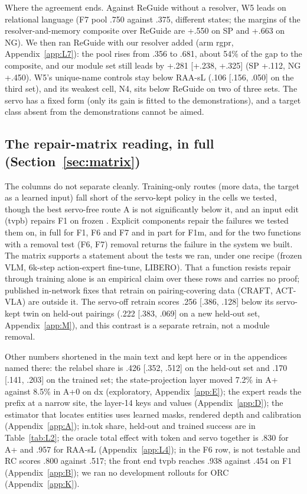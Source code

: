 Where the agreement ends. Against ReGuide without a resolver, W5 leads on relational language (F7 pool .750 against .375, different states; the margins of the resolver-and-memory composite over ReGuide are +.550 on SP and +.663 on NG). We then ran ReGuide with our resolver added (arm rgpr, Appendix~\ref{app:L7}): the pool rises from .356 to .681, about 54\% of the gap to the composite, and our module set still leads by +.281 [+.238, +.325] (SP +.112, NG +.450). W5's unique-name controls stay below RAA-sL (\mi.106 [\mi.156, \mi.050] on the third set), and its weakest cell, N4, sits below ReGuide on two of three sets. The servo has a fixed form (only its gain is fitted to the demonstrations), and a target class absent from the demonstrations cannot be aimed.

\subsection{The repair-matrix reading, in full (Section~\ref{sec:matrix})}
\label{app:L6}

The columns do not separate cleanly. Training-only routes (more data, the target as a learned input) fall short of the servo-kept policy in the cells we tested, though the best servo-free route A is not significantly below it, and an input edit (tvpb) repairs F1 on frozen \pifive. Explicit components repair the failures we tested them on, in full for F1, F6 and F7 and in part for F1m, and for the two functions with a removal test (F6, F7) removal returns the failure in the system we built. The matrix supports a statement about the tests we ran, under one recipe (frozen VLM, 6k-step action-expert fine-tune, LIBERO). That a function resists repair through training alone is an empirical claim over these rows and carries no proof; published in-network fixes that retrain on pairing-covering data (CRAFT, ACT-VLA) are outside it. The \pizero{} servo-off retrain scores \mi.256 [\mi.386, \mi.128] below its servo-kept twin on held-out pairings (\mi.222 [\mi.383, \mi.069] on a new held-out set, Appendix~\ref{app:M}), and this contrast is a separate retrain, not a module removal.

Other numbers shortened in the main text and kept here or in the appendices named there: the relabel share is .426 [.352, .512] on the held-out set and .170 [.141, .203] on the trained set; the state-projection layer moved 7.2\% in A+ against 8.5\% in A+0 on dx (exploratory, Appendix~\ref{app:E}); the expert reads the prefix at a narrow site, the layer-14 keys and values (Appendix~\ref{app:D}); the estimator that locates entities uses learned masks, rendered depth and calibration (Appendix~\ref{app:A}); \pizero{} in.tok share, held-out and trained success are in Table~\ref{tab:L2}; the oracle total effect with token and servo together is .830 for A+ and .957 for RAA-sL (Appendix~\ref{app:L4}); in the F6 row, \pizero{} is not testable and RC scores .800 against .517; the front end tvpb reaches .938 against .454 on F1 (Appendix~\ref{app:B}); we ran no development rollouts for ORC (Appendix~\ref{app:K}).

